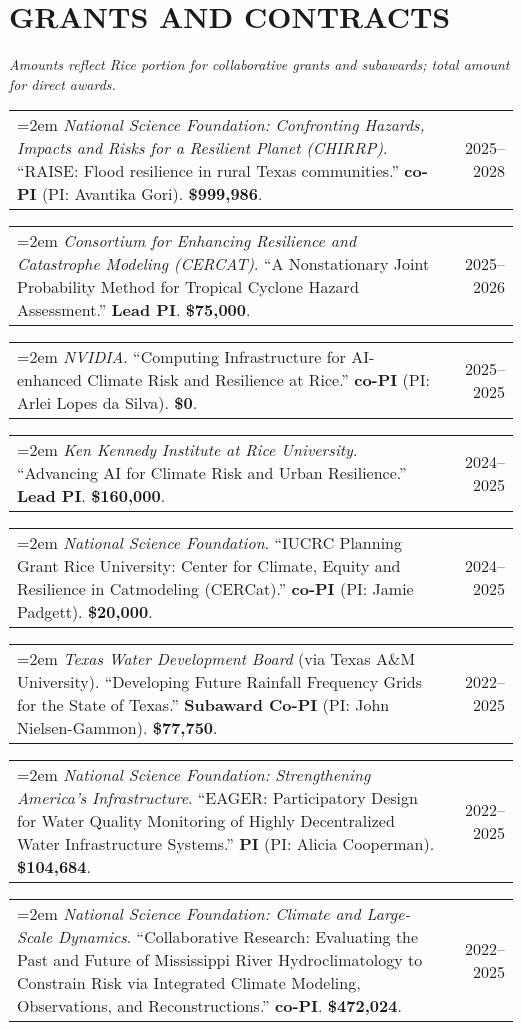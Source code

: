 \documentclass[10pt,oneside]{article}
\makeatletter
\newenvironment{alignedentrieshang}[1][2em]{%
  \noindent%
}{%
}
\newcommand{\hangingitem}[2]{%
  \noindent%
  \begin{tabular*}{\textwidth}{@{}p{0.85\textwidth}@{\extracolsep{\fill}}r@{}}%
    \hangindent=2em \hangafter=1 #1 & #2%
  \end{tabular*}%
}
\makeatother
\begin{document}

\section{GRANTS AND CONTRACTS}

\textit{Amounts reflect Rice portion for collaborative grants and subawards; total amount for direct awards.}

\bigskip

\begin{alignedentrieshang}

\hangingitem{\textit{National Science Foundation}\textit{: Confronting Hazards, Impacts and Risks for a Resilient Planet (CHIRRP)}. ``RAISE: Flood resilience in rural Texas communities.'' \textbf{co-PI} (PI: Avantika Gori). \textbf{\$999,986}.}{2025--2028}

\hangingitem{\textit{Consortium for Enhancing Resilience and Catastrophe Modeling (CERCAT)}. ``A Nonstationary Joint Probability Method for Tropical Cyclone Hazard Assessment.'' \textbf{Lead PI}. \textbf{\$75,000}.}{2025--2026}

\hangingitem{\textit{NVIDIA}. ``Computing Infrastructure for AI-enhanced Climate Risk and Resilience at Rice.'' \textbf{co-PI} (PI: Arlei Lopes da Silva). \textbf{\$0}.}{2025--2025}

\hangingitem{\textit{Ken Kennedy Institute at Rice University}. ``Advancing AI for Climate Risk and Urban Resilience.'' \textbf{Lead PI}. \textbf{\$160,000}.}{2024--2025}

\hangingitem{\textit{National Science Foundation}. ``IUCRC Planning Grant Rice University: Center for Climate, Equity and Resilience in Catmodeling (CERCat).'' \textbf{co-PI} (PI: Jamie Padgett). \textbf{\$20,000}.}{2024--2025}

\hangingitem{\textit{Texas Water Development Board} (via Texas A\&M University). ``Developing Future Rainfall Frequency Grids for the State of Texas.'' \textbf{Subaward Co-PI} (PI: John Nielsen-Gammon). \textbf{\$77,750}.}{2022--2025}

\hangingitem{\textit{National Science Foundation}\textit{: Strengthening America's Infrastructure}. ``EAGER: Participatory Design for Water Quality Monitoring of Highly Decentralized Water Infrastructure Systems.'' \textbf{PI} (PI: Alicia Cooperman). \textbf{\$104,684}.}{2022--2025}

\hangingitem{\textit{National Science Foundation}\textit{: Climate and Large-Scale Dynamics}. ``Collaborative Research: Evaluating the Past and Future of Mississippi River Hydroclimatology to Constrain Risk via Integrated Climate Modeling, Observations, and Reconstructions.'' \textbf{co-PI}. \textbf{\$472,024}.}{2022--2025}


\end{alignedentrieshang}
\end{document}
